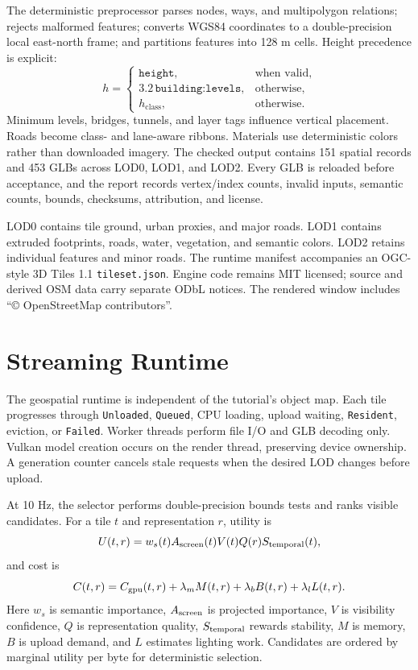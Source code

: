 \documentclass[10pt,twocolumn]{article}
\begin{document}
The deterministic preprocessor parses nodes, ways, and multipolygon relations; rejects malformed
features; converts WGS84 coordinates to a double-precision local east-north frame; and partitions
features into 128 m cells. Height precedence is explicit:
\[
h=\begin{cases}
\texttt{height},&\text{when valid},\\
3.2\,\texttt{building:levels},&\text{otherwise},\\
h_{\mathrm{class}},&\text{otherwise}.
\end{cases}
\]
Minimum levels, bridges, tunnels, and layer tags influence vertical placement. Roads become
class- and lane-aware ribbons. Materials use deterministic colors rather than downloaded imagery.
The checked output contains 151 spatial records and 453 GLBs across LOD0, LOD1, and LOD2. Every GLB
is reloaded before acceptance, and the report records vertex/index counts, invalid inputs, semantic
counts, bounds, checksums, attribution, and license.

LOD0 contains tile ground, urban proxies, and major roads. LOD1 contains extruded footprints, roads,
water, vegetation, and semantic colors. LOD2 retains individual features and minor roads. The
runtime manifest accompanies an OGC-style 3D Tiles 1.1 \texttt{tileset.json}. Engine code remains
MIT licensed; source and derived OSM data carry separate ODbL notices. The rendered window includes
``© OpenStreetMap contributors''.

\clearpage
\section{Streaming Runtime}
The geospatial runtime is independent of the tutorial's object map. Each tile progresses through
\texttt{Unloaded}, \texttt{Queued}, CPU loading, upload waiting, \texttt{Resident}, eviction, or
\texttt{Failed}. Worker threads perform file I/O and GLB decoding only. Vulkan model creation occurs
on the render thread, preserving device ownership. A generation counter cancels stale requests when
the desired LOD changes before upload.

At 10 Hz, the selector performs double-precision bounds tests and ranks visible candidates. For a
tile $t$ and representation $r$, utility is
\begin{equation}
U(t,r)=w_s(t)A_{\rm screen}(t)V(t)Q(r)S_{\rm temporal}(t),
\end{equation}
and cost is
\begin{equation}
C(t,r)=C_{\rm gpu}(t,r)+\lambda_mM(t,r)+\lambda_bB(t,r)+\lambda_lL(t,r).
\end{equation}
Here $w_s$ is semantic importance, $A_{\rm screen}$ is projected importance, $V$ is visibility
confidence, $Q$ is representation quality, $S_{\rm temporal}$ rewards stability, $M$ is memory,
$B$ is upload demand, and $L$ estimates lighting work. Candidates are ordered by marginal utility
per byte for deterministic selection.
\end{document}
